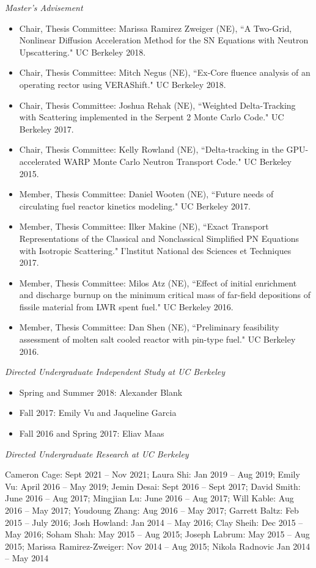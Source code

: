 \textit{Master's Advisement}
\begin{itemize}
\item Chair, Thesis Committee: Marissa Ramirez Zweiger (NE), ``A Two-Grid, Nonlinear Diffusion Acceleration Method for the SN Equations with Neutron Upscattering." UC Berkeley 2018.
%
\item Chair, Thesis Committee: Mitch Negus (NE), ``Ex-Core fluence analysis of an operating rector using VERAShift." UC Berkeley 2018.
%
\item Chair, Thesis Committee: Joshua Rehak (NE), ``Weighted Delta-Tracking with Scattering implemented in the Serpent 2 Monte Carlo Code." UC Berkeley 2017.
%
\item Chair, Thesis Committee: Kelly Rowland (NE), ``Delta-tracking in the GPU-accelerated WARP Monte Carlo Neutron Transport Code." UC Berkeley 2015.
%
\item Member, Thesis Committee: Daniel Wooten (NE), ``Future needs of circulating fuel reactor kinetics modeling." UC Berkeley 2017.
\item Member, Thesis Committee: Ilker Makine (NE), ``Exact Transport Representations of the Classical and Nonclassical Simplified PN Equations with Isotropic Scattering." I'lnstitut National des Sciences et Techniques 2017.
%
\item Member, Thesis Committee: Milos Atz (NE), ``Effect of initial enrichment and discharge burnup on the minimum critical mass of far-field depositions of fissile material from LWR spent fuel." UC Berkeley 2016.
%
\item Member, Thesis Committee: Dan Shen (NE), ``Preliminary feasibility assessment of molten salt cooled reactor with pin-type fuel." UC Berkeley 2016.
\end{itemize}

\textit{Directed Undergraduate Independent Study at UC Berkeley}
\begin{itemize}
\item Spring and Summer 2018: Alexander Blank
\item Fall 2017: Emily Vu and Jaqueline Garcia
\item Fall 2016 and Spring 2017: Eliav Maas
\end{itemize}
\textit{Directed Undergraduate Research at UC Berkeley}
\vspace*{-.6 em}
\begin{addmargin}[1em]{0 em}
Cameron Cage: Sept 2021 -- Nov 2021;
Laura Shi: Jan 2019 -- Aug 2019;
Emily Vu: April 2016 -- May 2019; 
Jemin Desai: Sept 2016 -- Sept 2017; 
David Smith: June 2016 -- Aug 2017; 
Mingjian Lu: June 2016 -- Aug 2017; 
Will Kable: Aug 2016 -- May 2017; 
Youdoung Zhang: Aug 2016 -- May 2017; 
Garrett Baltz: Feb 2015 -- July 2016; 
Josh Howland: Jan 2014 -- May 2016; 
Clay Sheih: Dec 2015 -- May 2016;
Soham Shah: May 2015 -- Aug 2015; 
Joseph Labrum: May 2015 -- Aug 2015; 
Marissa Ramirez-Zweiger: Nov 2014 -- Aug 2015; 
Nikola Radnovic Jan 2014 -- May 2014 

\end{addmargin}

